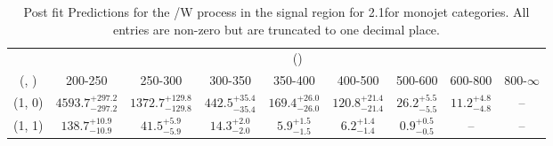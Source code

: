 \begin{table}[h!]
\tiny
\centering
\caption{Post fit Predictions for the \ttbar/W process in the signal region for 2.1\ifb for monojet categories. All entries are non-zero but are truncated to one decimal place.\label{tab:predseppost_sig_ttw_mono}}
\begin{tabular}
{ccccccccc}
	\hline\hline
	& \multicolumn{8}{c}{\scalht (\gev)} \\ 
	 (\njet,  \nb) & 200-250 & 250-300 & 300-350 & 350-400 & 400-500 & 500-600 & 600-800 & 800-$\infty$ \\ [0.8ex] 
\hline
	(1, 0) & $4593.7^{+ 297.2 }_{- 297.2 }$ & $1372.7^{+ 129.8 }_{- 129.8 }$ & $442.5^{+ 35.4 }_{- 35.4 }$ & $169.4^{+ 26.0 }_{- 26.0 }$ & $120.8^{+ 21.4 }_{- 21.4 }$ & $26.2^{+ 5.5 }_{- 5.5 }$ & $11.2^{+ 4.8 }_{- 4.8 }$ & -- \\[0.5ex] 
	(1, 1) & $138.7^{+ 10.9 }_{- 10.9 }$ & $41.5^{+ 5.9 }_{- 5.9 }$ & $14.3^{+ 2.0 }_{- 2.0 }$ & $5.9^{+ 1.5 }_{- 1.5 }$ & $6.2^{+ 1.4 }_{- 1.4 }$ & $0.9^{+ 0.5 }_{- 0.5 }$ & -- & -- \\[0.5ex] 
	\hline
	\hline
\end{tabular}
\end{table}
